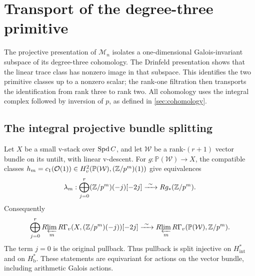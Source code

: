 \section{Transport of the degree-three primitive}\label{sec:degree-three}

The projective presentation of $\mathcal M_n$ isolates a
one-dimensional Galois-invariant subspace of its degree-three
cohomology. The Drinfeld presentation shows that the linear trace
class has nonzero image in that subspace. This identifies the two
primitive classes up to a nonzero scalar; the rank-one filtration
then transports the identification from rank three to rank two.
All cohomology uses the integral complex followed by inversion of
$p$, as defined in \cref{sec:cohomology}.

\subsection{The integral projective bundle splitting}

\begin{lemma}\label{lem:projective-bundle}
Let $X$ be a small v-stack over $\operatorname{Spd} C$, and let $\mathcal W$ be a
rank-$(r+1)$ vector bundle on its untilt, with linear v-descent.
For $g:\mathbb P(\mathcal W)\to X$, the compatible classes
$h_m=c_1(\mathcal O(1))\in H_v^2(\mathbb P(\mathcal W),(\mathbb Z/p^m)(1))$
give equivalences
\begin{equation}\label{eq:projective-finite}
 \lambda_m:
 \bigoplus_{j=0}^r(\mathbb Z/p^m)(-j)[-2j]
       \xrightarrow{\ \sim\ } Rg_*(\mathbb Z/p^m).
\end{equation}
Consequently
\begin{equation}\label{eq:projective-integral}
 \bigoplus_{j=0}^r
  R\!\varprojlim_m R\Gamma_v(X,(\mathbb Z/p^m)(-j))[-2j]
 \xrightarrow{\ \sim\ }
  R\!\varprojlim_m R\Gamma_v(\mathbb P(\mathcal W),\mathbb Z/p^m).
\end{equation}
The term $j=0$ is the original pullback.  Thus pullback is split
injective on $H^*_{\mathrm{int}}$ and on $H^*_{\mathrm b}$.
These statements are equivariant for actions on the vector bundle,
including arithmetic Galois actions.
\end{lemma}

